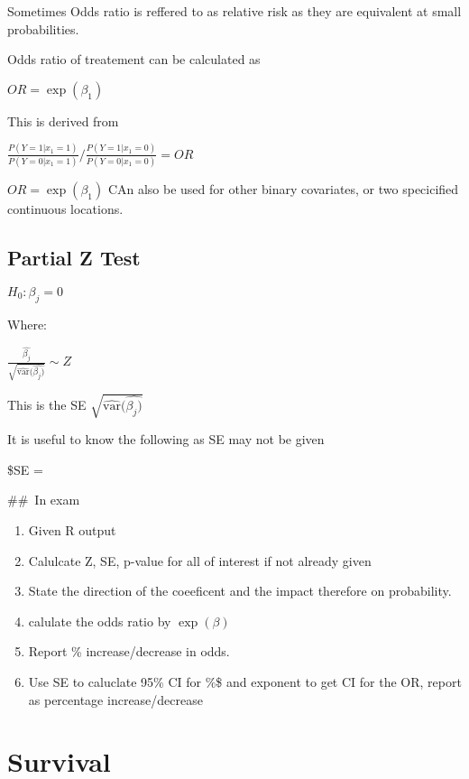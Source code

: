 \documentclass[
  letterpaper,
  DIV=11,
  numbers=noendperiod]{scrreprt}
\providecommand{\tightlist}{%
  \setlength{\itemsep}{0pt}\setlength{\parskip}{0pt}}\usepackage{longtable,booktabs,array}
\begin{document}
Sometimes Odds ratio is reffered to as relative risk as they are
equivalent at small probabilities.

Odds ratio of treatement can be calculated as

\(OR = \exp(\beta_1)\)

This is derived from

\(\frac{P(Y=1|x_1 = 1)}{P(Y=0|x_1 = 1)}/ \frac{P(Y=1|x_1 = 0)}{P(Y=0|x_1 = 0)} = OR\)

\(OR = \exp(\beta_1)\) CAn also be used for other binary covariates, or
two specicified continuous locations.

\hypertarget{partial-z-test}{%
\section{Partial Z Test}\label{partial-z-test}}

\(H_0 : \beta_j = 0\)

Where:

\(\frac{\hat{\beta_j}}{  \sqrt{  \hat{\text{var}}(\hat{\beta_j)}  } } \sim Z\)

This is the SE \(\sqrt{\hat{\text{var}}(\hat{\beta_j)}}\)

It is useful to know the following as SE may not be given

\$SE = 

\#\#~In exam

\begin{enumerate}
\def\labelenumi{\arabic{enumi})}
\tightlist
\item
  Given R output
\item
  Calulcate Z, SE, p-value for all of interest if not already given
\item
  State the direction of the coeeficent and the impact therefore on
  probability.
\item
  calulate the odds ratio by \(\exp(\beta)\)
\item
  Report \% increase/decrease in odds.
\item
  Use SE to caluclate 95\% CI for \%\beta\$ and exponent to get CI for
  the OR, report as percentage increase/decrease
\end{enumerate}


\hypertarget{survival}{%
\chapter{Survival}\label{survival}}
\end{document}
